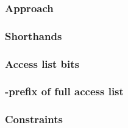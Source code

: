 \subsubsection{Approach                            } \label{rlp txn v2: phase constraints: access list: approach}              
\subsubsection{Shorthands                          } \label{rlp txn v2: phase constraints: access list: shorthands}            
\subsubsection{Access list bits                    } \label{rlp txn v2: phase constraints: access list: access list bits}      
\subsubsection{\rlp{}-prefix of full access list   } \label{rlp txn v2: phase constraints: access list: access list prefix}    
\subsubsection{Constraints                         } \label{rlp txn v2: phase constraints: access list: constraints}           

